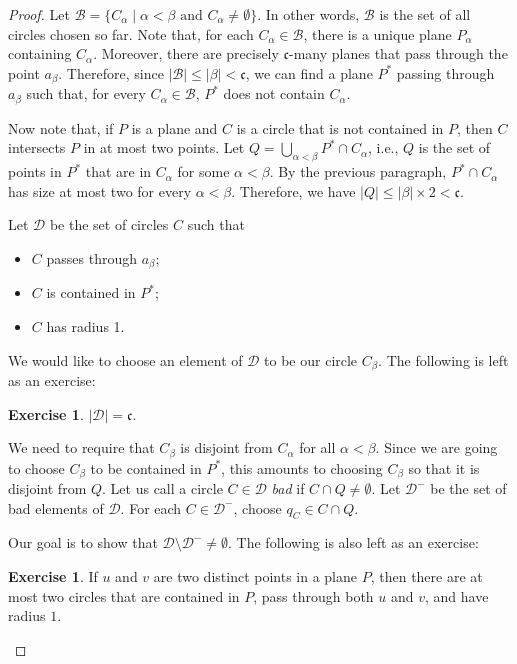\documentclass[a4paper]{memoir}
\theoremstyle{definition}
\newtheorem{exercise}[theorem]{Exercise}
\newcommand{\mc}{\mathcal}
\begin{document}
\begin{proof}
  Let $\mathcal{B} = \{C_\alpha \mid \alpha < \beta \text{ and } C_\alpha \neq \emptyset\}$. 
  In other words, $\mathcal{B}$ is the set of all circles chosen so far. Note that, for each 
  $C_\alpha \in \mc{B}$, there is a unique plane $P_\alpha$ containing $C_\alpha$. Moreover, 
  there are precisely $\mathfrak{c}$-many planes that pass through the point $a_\beta$. 
  Therefore, since $|\mathcal{B}| \leq |\beta| < \mathfrak{c}$, we can find a plane 
  $P^*$ passing through $a_\beta$ such that, for every $C_\alpha \in \mathcal{B}$, 
  $P^*$ does not contain $C_\alpha$.
  
  Now note that, if $P$ is a plane and $C$ is a circle that is not contained in $P$, then 
  $C$ intersects $P$ in at most two points. Let $Q = \bigcup_{\alpha < \beta} P^* \cap C_\alpha$, 
  i.e., $Q$ is the set of points in $P^*$ that are in $C_\alpha$ for some $\alpha < \beta$. 
  By the previous paragraph, $P^* \cap C_\alpha$ has size at most two for every $\alpha < \beta$. 
  Therefore, we have $|Q| \leq |\beta| \times 2 < \mathfrak{c}$.
  
  Let $\mc{D}$ be the set of circles $C$ such that
  \begin{itemize}
    \item $C$ passes through $a_\beta$;
    \item $C$ is contained in $P^*$;
    \item $C$ has radius 1.
  \end{itemize}
  
  We would like to choose an element of $\mc{D}$ to be our circle $C_\beta$. 
  The following is left as an exercise:
  
  \begin{exercise}
    $|\mc{D}| = \mathfrak{c}$.
  \end{exercise}
  
  We need to require that $C_\beta$ is disjoint from $C_\alpha$ for all $\alpha < \beta$. 
  Since we are going to choose $C_\beta$ to be contained in $P^*$, this amounts to choosing 
  $C_\beta$ so that it is disjoint from $Q$.
  Let us call a circle $C \in \mc{D}$ \emph{bad} if $C \cap Q \neq \emptyset$. Let $\mc{D}^-$ 
  be the set of bad elements of $\mc{D}$. For each $C \in \mc{D}^-$, choose 
  $q_C \in C \cap Q$. 
  
  Our goal is to show that $\mc{D} \setminus \mc{D}^- \neq \emptyset$. The following is also left as 
  an exercise:
  
  \begin{exercise}
    If $u$ and $v$ are two distinct points in a plane $P$, then there are at most two circles 
    that are contained in $P$, pass through both $u$ and $v$, and have radius $1$.
  \end{exercise}
  

\end{proof}
\end{document}
